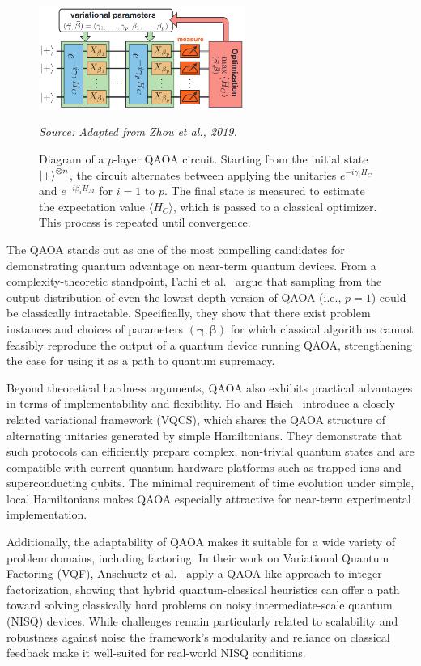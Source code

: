 \begin{figure}[h]
    \centering
    \includegraphics[width=0.6\textwidth]{01-introduction/figs/qaoa.png}
    \caption{Diagram of a $p$-layer QAOA circuit. Starting from the initial state $\ket{+}^{\otimes n}$,
    the circuit alternates between applying the unitaries $e^{-i \gamma_i H_C}$ and $e^{-i \beta_i H_M}$
    for $i = 1$ to $p$. The final state is measured to estimate the expectation value $\langle H_C \rangle$,
    which is passed to a classical optimizer. This process is repeated until convergence.}
    \vspace{0.3em}
    \small\textit{Source: Adapted from Zhou et al., 2019.}
    \label{fig:qaoa}
\end{figure}

The QAOA stands out as one of the most compelling candidates for demonstrating quantum advantage
on near-term quantum devices. From a complexity-theoretic standpoint, Farhi et al.~\cite{farhi_quantum_2019}
argue that sampling from the output distribution of even the lowest-depth version of QAOA (i.e., $p=1$)
could be classically intractable. Specifically, they show that there exist problem instances
and choices of parameters $(\bm{\gamma}, \bm{\beta})$ for which classical algorithms cannot
feasibly reproduce the output of a quantum device running QAOA, strengthening the case for
using it as a path to quantum supremacy.

Beyond theoretical hardness arguments, QAOA also exhibits practical advantages in terms of
implementability and flexibility. Ho and Hsieh~\cite{ho_efficient_2019} introduce a closely
related variational framework (VQCS), which shares the QAOA structure of alternating unitaries
generated by simple Hamiltonians. They demonstrate that such protocols can efficiently prepare
complex, non-trivial quantum states and are compatible with current quantum hardware platforms
such as trapped ions and superconducting qubits. The minimal requirement of time evolution
under simple, local Hamiltonians makes QAOA especially attractive for near-term experimental
implementation.

Additionally, the adaptability of QAOA makes it suitable for a wide variety of problem domains,
including factoring. In their work on Variational Quantum Factoring (VQF), Anschuetz et
al.~\cite{anschuetz_variational_2018} apply a QAOA-like approach to integer factorization,
showing that hybrid quantum-classical heuristics can offer a path toward solving classically
hard problems on noisy intermediate-scale quantum (NISQ) devices. While challenges
remain particularly related to scalability and robustness against noise the framework's
modularity and reliance on classical feedback make it well-suited for real-world NISQ conditions.